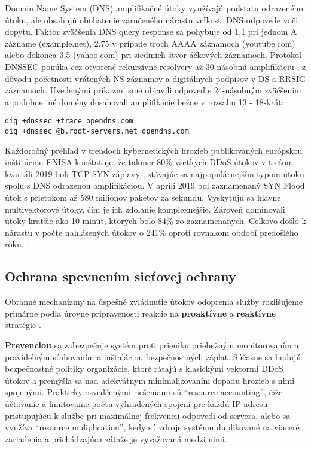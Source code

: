 \documentclass[12pt, a4paper]{article}
\begin{document}
Domain Name System (DNS) amplifikačné útoky využívajú podstatu odrazeného útoku, ale obsahujú obohatenie
zaručeného nárastu veľkosti DNS odpovede voči dopytu. Faktor zväčšenia DNS query response sa pohybuje
od 1,1 pri jednom A zázname (example.net), 2,75 v prípade troch AAAA záznamoch (youtube.com) alebo 
dokonca 3,5 (yahoo.com) pri siedmich štvor-áčkových záznamoch. Protokol DNSSEC ponúka
cez otvorené rekurzívne resolvery až 30-násobnú amplifikáciu \cite{csirt-ddos}, 
z dôvodu početnosti vrátených NS záznamov a digitálnych podpisov v DS a RRSIG záznamoch. 
Uvedenými príkazmi sme objavili odpoveď s 24-násobným zväčšením a podobne iné domény dosahovali
amplifikácie bežne v rozsahu 13 - 18-krát:
\begin{lstlisting}
dig +dnssec +trace opendns.com
dig +dnssec @b.root-servers.net opendns.com
\end{lstlisting}

Každoročný prehľad v trendoch kybernetických hrozieb publikovaných európskou inštitúciou ENISA
konštatuje, že takmer 80\% všetkých DDoS útokov v treťom kvartáli 2019 boli TCP SYN záplavy 
\cite{enisa-ddos}, stávajúc sa najpopulárnejším typom útoku spolu s DNS odrazenou amplifikáciou. 
V apríli 2019 bol zaznamenaný SYN Flood útok s prietokom až 580 miliónov paketov za sekundu. Vyskytujú
sa hlavne multivektorové útoky, čím je ich zdolanie komplexnejšie. Zároveň dominovali útoky kratšie
ako 10 minút, ktorých bolo 84\% zo zaznamenaných. Celkovo došlo k nárastu v počte nahlásených útokov
o 241\% oproti rovnakom období predošlého roku. \cite{enisa-ddos}.

\subsection{Ochrana spevnením sieťovej ochrany}
Obranné mechanizmy na úspešné zvládnutie útokov odoprenia služby rozlišujeme primárne podľa
úrovne pripravenosti reakcie na \textbf{proaktívne} a \textbf{reaktívne} stratégie
\cite{ddos-anatomy-2004}.

\textbf{Prevenciou} sa zabezpečuje systém proti prieniku priebežným monitorovaním
a pravidelným sťahovaním a inštaláciou bezpečnostných záplat. Súčasne sa budujú
bezpečnostné politiky organizácie, ktoré rátajú s klasickými vektormi DDoS útokov a premýšľa sa 
nad adekvátnym minimalizovaním dopadu hrozieb s nimi spojenými. Prakticky osvedčenými 
riešeniami sú \enquote{resource accounting}, čiže účtovanie a limitovanie počtu vyhradených spojení 
pre každú IP adresu pristupujúcu k službe pri maximálnej frekvencii odpovedí od servera, alebo sa využíva 
\enquote{resource muliplication}, kedy sú zdroje systému duplikované na viaceré zariadenia a prichádzajúca 
záťaže je vyvažovaná medzi nimi.
\end{document}
